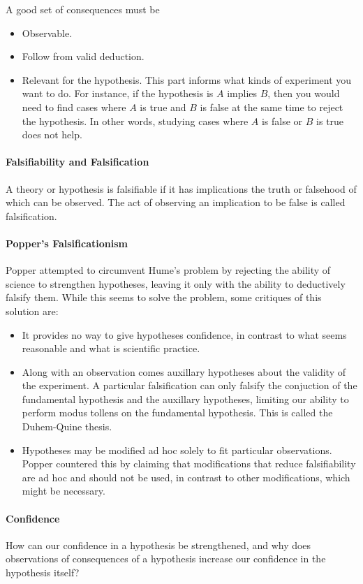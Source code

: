 A good set of consequences must be
\begin{itemize}
	\item Observable.
	\item Follow from valid deduction.
	\item Relevant for the hypothesis. This part informs what kinds of experiment you want to do. For instance, if the hypothesis is $A$ implies $B$, then you would need to find cases where $A$ is true and $B$ is false at the same time to reject the hypothesis. In other words, studying cases where $A$ is false or $B$ is true does not help.
\end{itemize}

\paragraph{Falsifiability and Falsification}
A theory or hypothesis is falsifiable if it has implications the truth or falsehood of which can be observed. The act of observing an implication to be false is called falsification.

\paragraph{Popper's Falsificationism}
Popper attempted to circumvent Hume's problem by rejecting the ability of science to strengthen hypotheses, leaving it only with the ability to deductively falsify them. While this seems to solve the problem, some critiques of this solution are:
\begin{itemize}
	\item It provides no way to give hypotheses confidence, in contrast to what seems reasonable and what is scientific practice.
	\item Along with an observation comes auxillary hypotheses about the validity of the experiment. A particular falsification can only falsify the conjuction of the fundamental hypothesis and the auxillary hypotheses, limiting our ability to perform modus tollens on the fundamental hypothesis. This is called the Duhem-Quine thesis.
	\item Hypotheses may be modified ad hoc solely to fit particular observations. Popper countered this by claiming that modifications that reduce falsifiability are ad hoc and should not be used, in contrast to other modifications, which might be necessary.
\end{itemize}

\paragraph{Confidence}
How can our confidence in a hypothesis be strengthened, and why does observations of consequences of a hypothesis increase our confidence in the hypothesis itself?

